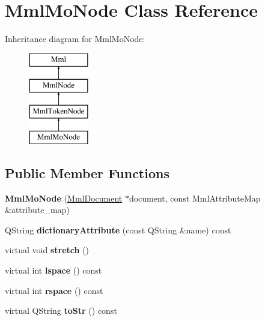 \hypertarget{class_mml_mo_node}{}\section{Mml\+Mo\+Node Class Reference}
\label{class_mml_mo_node}
Inheritance diagram for Mml\+Mo\+Node\+:\begin{figure}[H]
\begin{center}
\leavevmode
\includegraphics[height=4.000000cm]{class_mml_mo_node}
\end{center}
\end{figure}
\subsection*{Public Member Functions}
\begin{DoxyCompactItemize}
\item 
\mbox{\label{class_mml_mo_node_af84ee08ef3e8eb5bab3ffd134dc12397}} 
{\bfseries Mml\+Mo\+Node} (\mbox{\hyperlink{class_mml_document}{Mml\+Document}} $\ast$document, const Mml\+Attribute\+Map \&attribute\+\_\+map)
\item 
\mbox{\label{class_mml_mo_node_a4249de95f816e2f4015a10259b01861d}} 
Q\+String {\bfseries dictionary\+Attribute} (const Q\+String \&name) const
\item 
\mbox{\label{class_mml_mo_node_ad3d15eaa9a9905db0fe789b7244054e7}} 
virtual void {\bfseries stretch} ()
\item 
\mbox{\label{class_mml_mo_node_a0fa23a397ea1c425b867beb7a34a28a8}} 
virtual int {\bfseries lspace} () const
\item 
\mbox{\label{class_mml_mo_node_a8d81a69256132aa7f54195e9ff5d1d80}} 
virtual int {\bfseries rspace} () const
\item 
\mbox{\label{class_mml_mo_node_a8db55e1038a80a124fc289f3f3787611}} 
virtual Q\+String {\bfseries to\+Str} () const
\end{DoxyCompactItemize}
